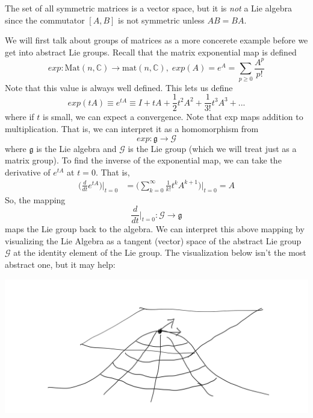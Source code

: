 \documentclass{article}
\begin{document}
    \begin{example}
    The set of all symmetric matrices is a vector space, but it is \textit{not} a Lie algebra since the commutator $[A,B]$ is not symmetric unless $A B = B A$. 
    \end{example}

    We will first talk about groups of matrices as a more concerete example before we get into abstract Lie groups. Recall that the matrix exponential map is defined
    \[exp: \text{Mat}(n, \mathbb{C}) \longrightarrow \text{mat}(n, \mathbb{C}), \; exp(A) = e^A = \sum_{p \geq 0} \frac{A^p}{p!}\]
    Note that this value is always well defined. This lets us define
    \[exp(t A) \equiv e^{t A} \equiv I + tA + \frac{1}{2} t^2 A^2 + \frac{1}{3!} t^3 A^3 + ... \]
    where if $t$ is small, we can expect a convergence. Note that exp maps addition to multiplication. That is, we can interpret it as a homomorphism from 
    \[exp: \mathfrak{g} \longrightarrow \mathcal{G}\]
    where $\mathfrak{g}$ is the Lie algebra and $\mathcal{G}$ is the Lie group (which we will treat just as a matrix group). To find the inverse of the exponential map, we can take the derivative of $e^{tA}$ at $t=0$. That is, 
    \begin{align*}
        \bigg(\frac{d}{d t} e^{tA} \bigg) \bigg|_{t=0} & = \bigg(\sum_{k=0}^\infty \frac{1}{k!} t^k A^{k+1} \bigg) \bigg|_{t=0} = A
    \end{align*}
    So, the mapping
    \[\frac{d}{dt} \bigg|_{t=0}: \mathcal{G} \longrightarrow \mathfrak{g}\]
    maps the Lie group back to the algebra. We can interpret this above mapping by visualizing the Lie Algebra as a tangent (vector) space of the abstract Lie group $\mathcal{G}$ at the identity element of the Lie group. The visualization below isn't the most abstract one, but it may help:
    \begin{center}
        \includegraphics[scale=0.2]{img/Lie_Algebra_Tangent_Space.PNG}
    \end{center}
\end{document}
